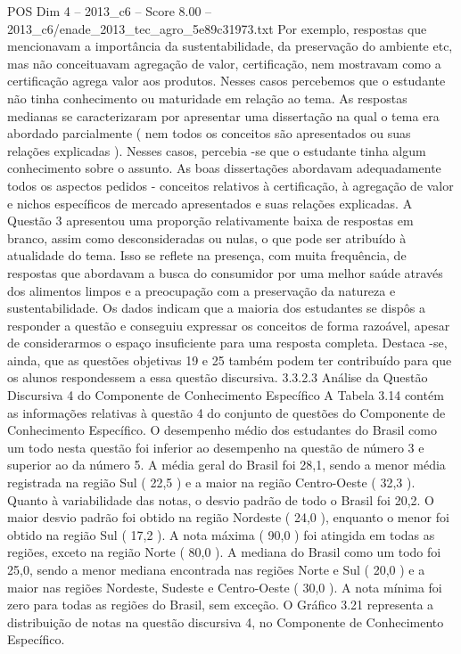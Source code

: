 \begin{textsample}{POS Dim 4 – 2013\_c6 – Score 8.00 – 2013\_c6/enade\_2013\_tec\_agro\_5e89c31973.txt}
Por exemplo, respostas que mencionavam a importância da sustentabilidade, da preservação do ambiente etc, mas não conceituavam agregação de valor, certificação, nem mostravam como a certificação agrega valor aos produtos.
Nesses casos percebemos que o estudante não tinha conhecimento ou maturidade em relação ao tema.
As respostas medianas se caracterizaram por apresentar uma dissertação na qual o tema era abordado parcialmente ( nem todos os conceitos são apresentados ou suas relações explicadas ).
Nesses casos, percebia -se que o estudante tinha algum conhecimento sobre o assunto.
As boas dissertações abordavam adequadamente todos os aspectos pedidos - conceitos relativos à certificação, à agregação de valor e nichos específicos de mercado apresentados e suas relações explicadas.
A Questão 3 apresentou uma proporção relativamente baixa de respostas em branco, assim como desconsideradas ou nulas, o que pode ser atribuído à atualidade do tema.
Isso se reflete na presença, com muita frequência, de respostas que abordavam a busca do consumidor por uma melhor saúde através dos alimentos limpos e a preocupação com a preservação da natureza e sustentabilidade.
Os dados indicam que a maioria dos estudantes se dispôs a responder a questão e conseguiu expressar os conceitos de forma razoável, apesar de considerarmos o espaço insuficiente para uma resposta completa.
Destaca -se, ainda, que as questões objetivas 19 e 25 também podem ter contribuído para que os alunos respondessem a essa questão discursiva. 3.3.2.3 Análise da Questão Discursiva 4 do Componente de Conhecimento Específico A Tabela 3.14 contém as informações relativas à questão 4 do conjunto de questões do Componente de Conhecimento Específico.
O desempenho médio dos estudantes do Brasil como um todo nesta questão foi inferior ao desempenho na questão de número 3 e superior ao da número 5.
A média geral do Brasil foi 28,1, sendo a menor média registrada na região Sul ( 22,5 ) e a maior na região Centro-Oeste ( 32,3 ).
Quanto à variabilidade das notas, o desvio padrão de todo o Brasil foi 20,2.
O maior desvio padrão foi obtido na região Nordeste ( 24,0 ), enquanto o menor foi obtido na região Sul ( 17,2 ).
A nota máxima ( 90,0 ) foi atingida em todas as regiões, exceto na região Norte ( 80,0 ).
A mediana do Brasil como um todo foi 25,0, sendo a menor mediana encontrada nas regiões Norte e Sul ( 20,0 ) e a maior nas regiões Nordeste, Sudeste e Centro-Oeste ( 30,0 ).
A nota mínima foi zero para todas as regiões do Brasil, sem exceção.
O Gráfico 3.21 representa a distribuição de notas na questão discursiva 4, no Componente de Conhecimento Específico.

\end{textsample}
